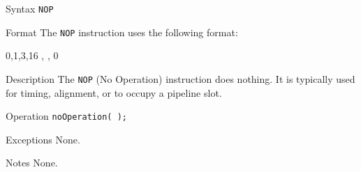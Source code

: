 %
%
\pagebreak
{}

\begin{iPageDescEntry}{Syntax}
    \texttt{NOP}
\end{iPageDescEntry}

\begin{iPageDescEntry}{Format}
    The \texttt{NOP} instruction uses the following format: \\

    \begin{flushleft}
    \drawInstrFormat
        {0,1,3,16}
        {\OpCodeGrpALU, \OpCodeNOP, 0}
    \end{flushleft}
\end{iPageDescEntry}

\begin{iPageDescEntry}{Description}
    The \texttt{NOP} (No Operation) instruction does nothing. It is typically used for timing, alignment, or to occupy a pipeline slot.
\end{iPageDescEntry}

\begin{iPageDescEntry}{Operation}
    \texttt{noOperation( );}
\end{iPageDescEntry}

\begin{iPageDescEntry}{Exceptions}
    None.
\end{iPageDescEntry}

\begin{iPageDescEntry}{Notes}
    None.
\end{iPageDescEntry}

